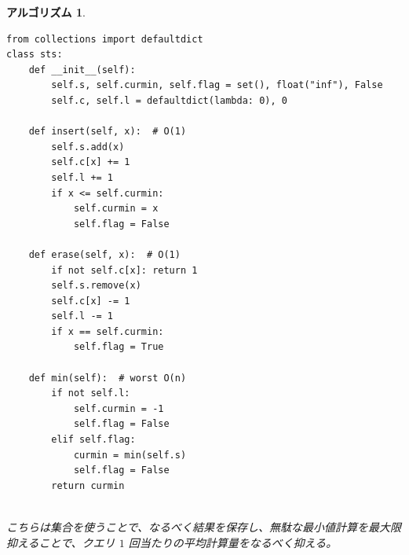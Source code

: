 \documentclass[12pt, a4j]{ltjsarticle}
\newtheorem{alg}[thm]{アルゴリズム}
\begin{document}
\newpage

\begin{alg}\quad\\\upshape
\begin{lstlisting}
from collections import defaultdict
class sts:
    def __init__(self):
        self.s, self.curmin, self.flag = set(), float("inf"), False
        self.c, self.l = defaultdict(lambda: 0), 0

    def insert(self, x):  # O(1)
        self.s.add(x)
        self.c[x] += 1
        self.l += 1
        if x <= self.curmin:
            self.curmin = x
            self.flag = False

    def erase(self, x):  # O(1)
        if not self.c[x]: return 1
        self.s.remove(x)
        self.c[x] -= 1
        self.l -= 1
        if x == self.curmin:
            self.flag = True

    def min(self):  # worst O(n)
        if not self.l:
            self.curmin = -1
            self.flag = False
        elif self.flag:
            curmin = min(self.s)
            self.flag = False
        return curmin
\end{lstlisting}\quad\\
こちらは集合を使うことで、なるべく結果を保存し、無駄な最小値計算を最大限抑えることで、クエリ $1$ 回当たりの平均計算量をなるべく抑える。
\end{alg}

\newpage
\end{document}
